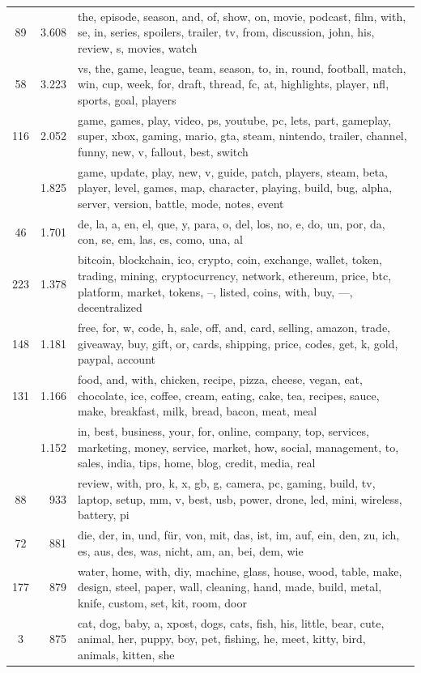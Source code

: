 \documentclass[11pt,a4paper,twoside]{article}
\begin{document}
\begin{longtable}[t]{cr >{\raggedright\arraybackslash}p{\textwidth}}
89 & 3.608 & the, episode, season, and, of, show, on, movie, podcast, film, with, se, in, series, spoilers, trailer, tv, from, discussion, john, his, review, s, movies, watch\\
58 & 3.223 & vs, the, game, league, team, season, to, in, round, football, match, win, cup, week, for, draft, thread, fc, at, highlights, player, nfl, sports, goal, players\\
116 & 2.052 & game, games, play, video, ps, youtube, pc, lets, part, gameplay, super, xbox, gaming, mario, gta, steam, nintendo, trailer, channel, funny, new, v, fallout, best, switch\\
\addlinespace
21 & 1.825 & game, update, play, new, v, guide, patch, players, steam, beta, player, level, games, map, character, playing, build, bug, alpha, server, version, battle, mode, notes, event\\
46 & 1.701 & de, la, a, en, el, que, y, para, o, del, los, no, e, do, un, por, da, con, se, em, las, es, como, una, al\\
223 & 1.378 & bitcoin, blockchain, ico, crypto, coin, exchange, wallet, token, trading, mining, cryptocurrency, network, ethereum, price, btc, platform, market, tokens, –, listed, coins, with, buy, —, decentralized\\
148 & 1.181 & free, for, w, code, h, sale, off, and, card, selling, amazon, trade, giveaway, buy, gift, or, cards, shipping, price, codes, get, k, gold, paypal, account\\
131 & 1.166 & food, and, with, chicken, recipe, pizza, cheese, vegan, eat, chocolate, ice, coffee, cream, eating, cake, tea, recipes, sauce, make, breakfast, milk, bread, bacon, meat, meal\\
\addlinespace
117 & 1.152 & in, best, business, your, for, online, company, top, services, marketing, money, service, market, how, social, management, to, sales, india, tips, home, blog, credit, media, real\\
88 & 933 & review, with, pro, k, x, gb, g, camera, pc, gaming, build, tv, laptop, setup, mm, v, best, usb, power, drone, led, mini, wireless, battery, pi\\
72 & 881 & die, der, in, und, für, von, mit, das, ist, im, auf, ein, den, zu, ich, es, aus, des, was, nicht, am, an, bei, dem, wie\\
177 & 879 & water, home, with, diy, machine, glass, house, wood, table, make, design, steel, paper, wall, cleaning, hand, made, build, metal, knife, custom, set, kit, room, door\\
3 & 875 & cat, dog, baby, a, xpost, dogs, cats, fish, his, little, bear, cute, animal, her, puppy, boy, pet, fishing, he, meet, kitty, bird, animals, kitten, she\\

\end{longtable}
\end{document}
